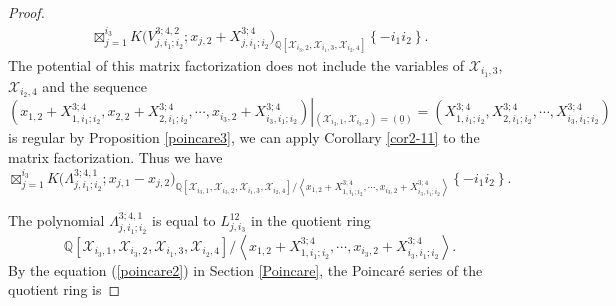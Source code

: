 \documentclass[10pt]{amsart}
\theoremstyle{break}
\begin{document}
\begin{proof}
\begin{eqnarray*}
\mathop{\boxtimes}^{i_3}_{j=1} K\Big( V_{j,i_1;i_2}^{3;4,2} ;x_{j,2}+X^{3;4}_{j,i_1;i_2} \Big)_{{{\mathbb{Q}}} [\mathcal{X}_{i_{3},2},\mathcal{X}_{i_{1},3},\mathcal{X}_{i_{2},4}] } 
\left\{ -i_1 i_2 \right\} .
\end{eqnarray*}
The potential of this matrix factorization does not include the variables of $\mathcal{X}_{i_1,3}$, $\mathcal{X}_{i_2,4}$ and 
the sequence 
\begin{equation*}
(x_{1,2}+X_{1,i_1;i_2}^{3;4},x_{2,2}+X_{2,i_1;i_2}^{3;4},\cdots ,x_{i_3,2}+X_{i_3,i_1;i_2}^{3;4})
\left|_{(\mathcal{X}_{i_{3},1},\mathcal{X}_{i_{3},2})=(\underline{0})}\right.=(X_{1,i_1;i_2}^{3;4},X_{2,i_1;i_2}^{3;4},\cdots ,X_{i_3,i_1;i_2}^{3;4})
\end{equation*} 
is regular by Proposition \ref{poincare3},
we can apply Corollary \ref{cor2-11} to the matrix factorization. 
Thus we have
\begin{equation*}
\mathop{\boxtimes}^{i_3}_{j=1} K\Big( \Lambda_{j,i_1;i_2}^{3;4,1} ;x_{j,1}-x_{j,2} \Big)_{{{\mathbb{Q}}} [\mathcal{X}_{i_{3},1},\mathcal{X}_{i_{3},2},\mathcal{X}_{i_{1},3},\mathcal{X}_{i_{2},4}]/\left< x_{1,2}+X^{3;4}_{1,i_1;i_2},\cdots ,x_{i_3,2}+X^{3;4}_{i_3,i_1;i_2} \right> } \left\{ -i_1 i_2 \right\}.
\end{equation*}

The polynomial $\Lambda_{j,i_1;i_2}^{3;4,1}$ is equal to $L_{j,i_3}^{12}$ in the quotient ring 
$$
{{\mathbb{Q}}} [\mathcal{X}_{i_{3},1},\mathcal{X}_{i_{3},2},\mathcal{X}_{i_{1},3},\mathcal{X}_{i_{2},4}]/\left< x_{1,2}+X^{3;4}_{1,i_1;i_2},\cdots ,x_{i_3,2}+X^{3;4}_{i_3,i_1;i_2} \right> .
$$
By the equation (\ref{poincare2}) in Section \ref{Poincare}, the Poincar\'e series of the quotient ring is


\end{proof}
\end{document}
